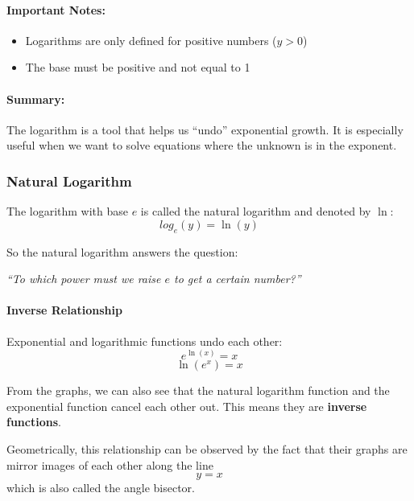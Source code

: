 \paragraph{Important Notes:}
\begin{itemize}
    \item Logarithms are only defined for positive numbers ($y > 0$)
    \item The base must be positive and not equal to 1
\end{itemize}

\paragraph{Summary:}
The logarithm is a tool that helps us ``undo'' exponential growth. It is especially useful when we want to solve equations where the unknown is in the exponent.


\subsubsection{Natural Logarithm}

The logarithm with base $e$ is called the natural logarithm and denoted by $\ln$:
\begin{equation}
     log_e (y) = \ln(y)
\end{equation}


So the natural logarithm answers the question:
\begin{center}
    \textit{``To which power must we raise $e$ to get a certain number?''}
\end{center}


\paragraph{Inverse Relationship}

Exponential and logarithmic functions undo each other:
\begin{equation}
    e^{\ln(x)} = x
\end{equation}
\begin{equation}
    \ln(e^x) = x
\end{equation}


From the graphs, we can also see that the natural logarithm function and the exponential function cancel each other out. This means they are \textbf{inverse functions}.

Geometrically, this relationship can be observed by the fact that their graphs are mirror images of each other along the line
\begin{equation}
    y = x
\end{equation}
which is also called the angle bisector.

